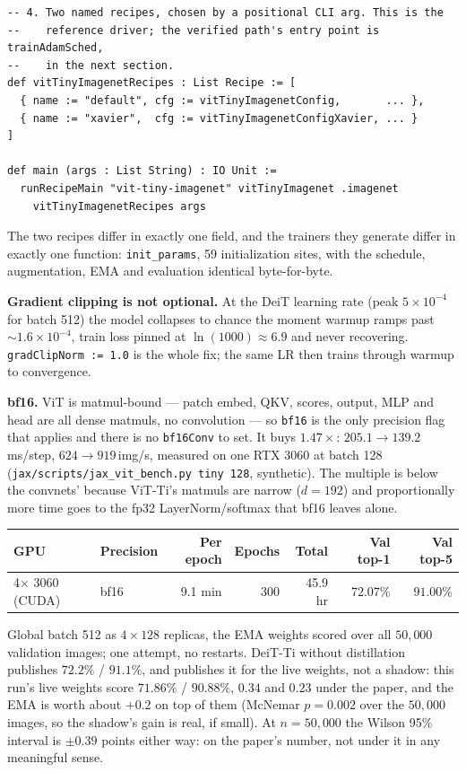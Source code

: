 \begin{verbatim}
-- 4. Two named recipes, chosen by a positional CLI arg. This is the
--    reference driver; the verified path's entry point is trainAdamSched,
--    in the next section.
def vitTinyImagenetRecipes : List Recipe := [
  { name := "default", cfg := vitTinyImagenetConfig,       ... },
  { name := "xavier",  cfg := vitTinyImagenetConfigXavier, ... }
]

def main (args : List String) : IO Unit :=
  runRecipeMain "vit-tiny-imagenet" vitTinyImagenet .imagenet
    vitTinyImagenetRecipes args
\end{verbatim}

\noindent The two recipes differ in exactly one field, and the trainers
they generate differ in exactly one function: \texttt{init\_params}, 59
initialization sites, with the schedule, augmentation, EMA and
evaluation identical byte-for-byte.

\textbf{Gradient clipping is not optional.} At the DeiT learning rate
(peak $5\times 10^{-4}$ for batch 512) the model collapses to chance the
moment warmup ramps past ${\sim}1.6\times 10^{-4}$, train loss pinned at
$\ln(1000)\approx 6.9$ and never recovering. \texttt{gradClipNorm := 1.0}
is the whole fix; the same LR then trains through warmup to convergence.

\textbf{bf16.} ViT is matmul-bound --- patch embed, QKV, scores, output,
MLP and head are all dense matmuls, no convolution --- so \texttt{bf16}
is the only precision flag that applies and there is no
\texttt{bf16Conv} to set. It buys $\mathbf{1.47\times}$: $205.1 \to
139.2$\,ms/step, $624 \to 919$\,img/s, measured on one RTX 3060 at batch
128 (\texttt{jax/scripts/jax\_vit\_bench.py tiny 128}, synthetic). The
multiple is below the convnets' because ViT-Ti's matmuls are narrow
($d{=}192$) and proportionally more time goes to the fp32
LayerNorm/softmax that bf16 leaves alone.

\begin{center}
\begin{tabular}{l l r r r r r}
\hline
GPU & Precision & Per epoch & Epochs & Total & Val top-1 & Val top-5 \\
\hline
4$\times$ 3060 (CUDA) & bf16 & 9.1 min & 300 & 45.9 hr & $\mathbf{72.07\%}$ & $\mathbf{91.00\%}$ \\
\hline
\end{tabular}
\end{center}

\noindent Global batch 512 as $4 \times 128$ replicas, the EMA weights
scored over all $50{,}000$ validation images; one attempt, no restarts.
DeiT-Ti without distillation publishes $72.2\%$ / $91.1\%$, and
publishes it for the live weights, not a shadow: this run's live weights
score $71.86\%$ / $90.88\%$, $0.34$ and $0.23$ under the paper, and the
EMA is worth about $+0.2$ on top of them (McNemar $p = 0.002$ over the
$50{,}000$ images, so the shadow's gain is real, if small). At
$n = 50{,}000$ the Wilson 95\% interval is $\pm0.39$ points either way:
on the paper's number, not under it in any meaningful sense.

